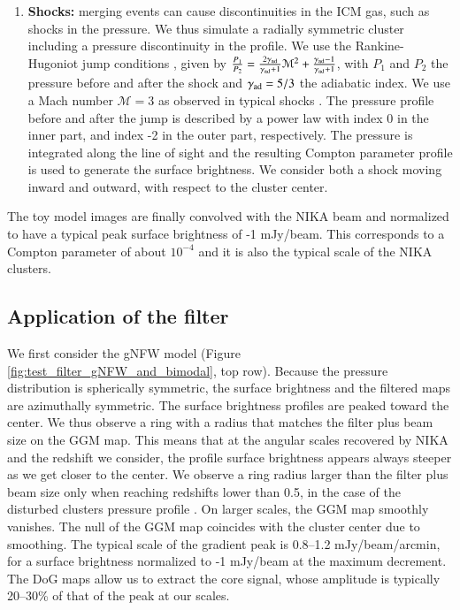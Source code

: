 \documentclass[twocolumn,traditabstract]{aa}
\begin{document}
\begin{enumerate}
\item {\bf Shocks:} merging events can cause discontinuities in the ICM gas, such as shocks in the pressure. We thus simulate a radially symmetric cluster including a pressure discontinuity in the profile. We use the Rankine-Hugoniot jump conditions \citep[see e.g.][for a review]{Sarazin2002}, given by $\frac{P_1}{P_2} = \frac{2 \gamma_{\rm ad}}{\gamma_{\rm ad}+1} \mathcal{M}^2 + \frac{\gamma_{\rm ad}-1}{\gamma_{\rm ad}+1}$, with $P_1$ and $P_2$ the pressure before and after the shock and $\gamma_{\rm ad} = 5/3$ the adiabatic index. We use a Mach number $\mathcal{M} = 3$ as observed in typical shocks \citep[e.g.][]{Markevitch2007}. The pressure profile before and after the jump is described by a power law with index 0 in the inner part, and index -2 in the outer part, respectively. The pressure is integrated along the line of sight and the resulting Compton parameter profile is used to generate the surface brightness. We consider both a shock moving inward and outward, with respect to the cluster center.
\end{enumerate}
The toy model images are finally convolved with the NIKA beam and normalized to have a typical peak surface brightness of -1 mJy/beam. This corresponds to a Compton parameter of about $10^{-4}$ and it is also the typical scale of the NIKA clusters.

\subsection{Application of the filter}
We first consider the gNFW model (Figure \ref{fig:test_filter_gNFW_and_bimodal}, top row). Because the pressure distribution is spherically symmetric, the surface brightness and the filtered maps are azimuthally symmetric. The surface brightness profiles are peaked toward the center. We thus observe a ring with a radius that matches the filter plus beam size on the GGM map. This means that at the angular scales recovered by NIKA and the redshift we consider, the profile surface brightness appears always steeper as we get closer to the center. We observe a ring radius larger than the filter plus beam size only when reaching redshifts lower than 0.5, in the case of the disturbed clusters pressure profile \citep[i.e. the flatter that we consider here][]{Arnaud2010}. On larger scales, the GGM map smoothly vanishes. The null of the GGM map coincides with the cluster center due to smoothing. The typical scale of the gradient peak is 0.8--1.2 mJy/beam/arcmin, for a surface brightness normalized to -1 mJy/beam at the maximum decrement. The DoG maps allow us to extract the core signal, whose amplitude is typically 20--30\% of that of the peak at our scales.
\end{document}
